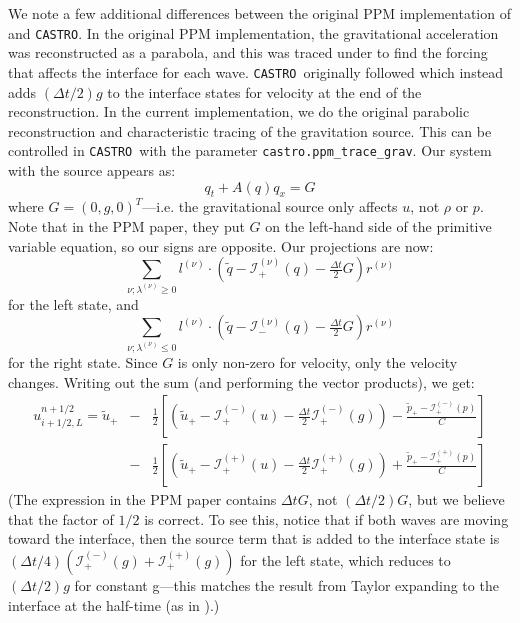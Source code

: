 \documentclass[iop]{../emulateapj}
\newcommand{\evm}{{(-)}}
\newcommand{\evp}{{(+)}}
\newcommand{\enu}{{(\nu)}}
\newcommand{\castro}{\texttt{CASTRO}}
\begin{document}
We note a few additional differences between the original PPM
implementation of \citet{ppm} and \castro.  In the original PPM
implementation, the gravitational acceleration was reconstructed as a parabola, and
this was traced under to find the forcing that affects the interface
for each wave.  \castro\ originally followed \citet{ppmunsplit} which instead adds
$(\Delta t/2)g$ to the interface states for velocity at the end of the
reconstruction.  In the current implementation, we do the original
parabolic reconstruction and characteristic tracing of the gravitation
source. This can be controlled in \castro\ with the parameter 
{\tt castro.ppm\_trace\_grav}. Our system with the source appears as:
\begin{equation}
q_t + A(q) q_x = G
\end{equation}
where $G = (0, g, 0)^T$---i.e. the gravitational source only affects
$u$, not $\rho$ or $p$.  Note that in the PPM paper, they put $G$ on 
the left-hand side of the primitive variable equation, so our signs are
opposite.  Our projections are now:
\begin{equation}
\sum_{\nu; \lambda^\enu \ge 0}l^\enu \cdot (\tilde{q} - \mathcal{I}^\enu_+(q) - \tfrac{\Delta t}{2} G) r^\enu
\end{equation}
for the left state, and
\begin{equation}
\sum_{\nu; \lambda^\enu \le 0} l^\enu \cdot (\tilde{q} - \mathcal{I}^\enu_-(q) - \tfrac{\Delta t}{2} G) r^\enu 
\end{equation}
for the right state.  Since $G$ is only non-zero for velocity, only
the velocity changes.  Writing out the sum (and performing the vector products), we
get:
\begin{eqnarray}
u_{i+1/2,L}^{n+1/2} =
   \tilde{u}_+ 
  &-& \frac{1}{2} \left [
      \left (\tilde{u}_+ - \mathcal{I}_+^\evm(u) - \frac{\Delta t}{2} \mathcal{I}^\evm_+(g) \right ) - 
       \frac{\tilde{p}_+ - \mathcal{I}_+^\evm(p)}{C} \right ] \nonumber \\
  &-& \frac{1}{2} \left [
      \left (\tilde{u}_+ - \mathcal{I}_+^\evp(u) - \frac{\Delta t}{2} \mathcal{I}^\evp_+(g) \right ) +
       \frac{\tilde{p}_+ - \mathcal{I}_+^\evp(p)}{C} \right ]
\end{eqnarray}
(The expression in the PPM paper contains $\Delta t G$, not $(\Delta t/2) G$,
but we believe that the factor of $1/2$ is correct.  To see this, notice that if both
waves are moving toward the interface, then the source term that is
added to the interface state is $(\Delta t/4) (\mathcal{I}_+^\evm(g) +
\mathcal{I}_+^\evp(g))$ for the left state, which reduces to $(\Delta
t/2) g$ for constant g---this matches the result from Taylor
expanding to the interface at the half-time (as in \citealt{ppmunsplit}).)
\end{document}
